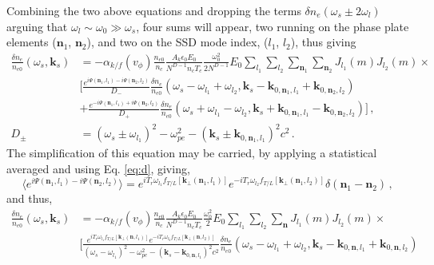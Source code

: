 \documentclass[
 reprint,
 amsmath,amssymb,
 aps,
]{revtex4-1}
\begin{document}
\begin{widetext}
Combining the two above equations and dropping the terms $\delta n_e(\omega_s \pm 2 \omega_l) $ arguing that  $\omega_l\sim \omega_0 \gg \omega _s$, four sums will appear, two running on the phase plate elements ($\mathbf{n}_1$, $\mathbf{n}_2$), and two on the SSD mode index, ($l_1$, $l_2$), thus giving
\begin{align}
   \frac{\delta n_e }{n_{e0}}(\omega_s,\mathbf{k}_s) &= -\alpha_{k/f}(v_\phi)\frac{n_{e0}}{n_c} \frac{A_k\epsilon_0 E_0}{N^{D-1} n_c T_e}\frac{\omega_0^2}{2N^{D-1}} E_0 \sum_{l_1} \sum_{l_2} \sum_{\mathbf{n}_1}    \sum_{\mathbf{n}_2}    J_{l_1}(m)J_{l_2}(m)\times  \nonumber \\
  & \Big[  
     \frac{e^{i \Psi(\mathbf{n}_1,l_1)-i \Psi(\mathbf{n}_2,l_2)}}{D_-}\frac{\delta n_e }{n_{e0}}  (\omega_s-\omega_{l_1}+\omega_{l_2},\mathbf{k}_s-\mathbf{k}_{0,\mathbf{n}_1,l_1}+\mathbf{k}_{0,\mathbf{n}_2,l_2})\nonumber\\
   & + \frac{e^{-i \Psi(\mathbf{n}_1,l_1)+i \Psi(\mathbf{n}_2,l_2)  }}{D_+} \frac{\delta n_e }{n_{e0}}(\omega_s+\omega_{l_1}-\omega_{l_2},\mathbf{k}_s+\mathbf{k}_{0,\mathbf{n}_1,l_1}-\mathbf{k}_{0,\mathbf{n}_2,l_2})
   \Big]
   \, ,\label{eq:fssd2} \\
   D_\pm &= (\omega_s\pm\omega_{l_1})^2 - \omega_{pe}^2 -(\mathbf{k}_s\pm\mathbf{k}_{0,\mathbf{n}_1,l_1})^2c^2 \, .
\end{align}
The simplification of this equation may be carried, by applying a statistical averaged and using Eq. \eqref{eq:d}, giving, 
 \begin{equation}\label{eq:d2}
 \langle e^{i \Psi(\mathbf{n}_1,l_1)-i \Psi(\mathbf{n}_2,l_2) }\rangle=
  e^{iT_{r} \omega_{l_1}f_{T/L}[\mathbf{k}_\perp(\mathbf{n}_1,l_1)]  }
  e^{-iT_{r}  \omega_{l_2}f_{T/L}[\mathbf{k}_\perp(\mathbf{n}_1,l_2)]  }
 \delta(\mathbf{n}_1-\mathbf{n}_2) \, ,
 \end{equation}
and thus,
\begin{align}
   \frac{\delta n_e }{n_{e0}}(\omega_s,\mathbf{k}_s) &= -\alpha_{k/f}(v_\phi) \frac{n_{e0}}{n_c} \frac{A_k\epsilon_0 E_0}{N^{D-1} n_c T_e}\frac{\omega_0^2}{2} E_0  \sum_{l_1}  \sum_{l_2} \sum_{\mathbf{n}}    J_{l_1}(m)J_{l_2}(m) \times \nonumber \\
  & \Big[  
     \frac{  e^{iT_{r} \omega_{l_1}f_{T/L}[\mathbf{k}_\perp(\mathbf{n},l_1)]  }
  e^{-iT_{r}  \omega_{l_2}f_{T/L}[\mathbf{k}_\perp(\mathbf{n},l_2)]  }
     }{(\omega_s-\omega_{l_1})^2 - \omega_{pe}^2 -(\mathbf{k}_s- \mathbf{k}_{0,\mathbf{n},l_1})^2c^2}
     \frac{\delta n_e }{n_{e0}}  (\omega_s-\omega_{l_1}+\omega_{l_2},\mathbf{k}_s-\mathbf{k}_{0,\mathbf{n},l_1}+\mathbf{k}_{0,\mathbf{n},l_2})\nonumber\\&

\end{align}
\end{widetext}
\end{document}

